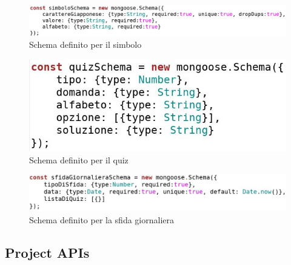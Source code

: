 \begin{figure}[!h]
\centering
\includegraphics[scale=0.35]{images/simbolo_schema_db.jpg}
\caption{Schema definito per il simbolo}
\label{fig:simbolo_schema_db}
\end{figure}
\noindent

\begin{figure}[!h]
\centering
\includegraphics[scale=0.35]{images/quiz_schema_db.jpg}
\caption{Schema definito per il quiz}
\label{fig:quiz_schema_db}
\end{figure}
\noindent

\begin{figure}[!h]
\centering
\includegraphics[scale=0.35]{images/sfida_giornaliera_schema_db.jpg}
\caption{Schema definito per la sfida giornaliera}
\label{fig:sfida_giornaliera_schema_db}
\end{figure}
\noindent


\subsection{Project APIs}
